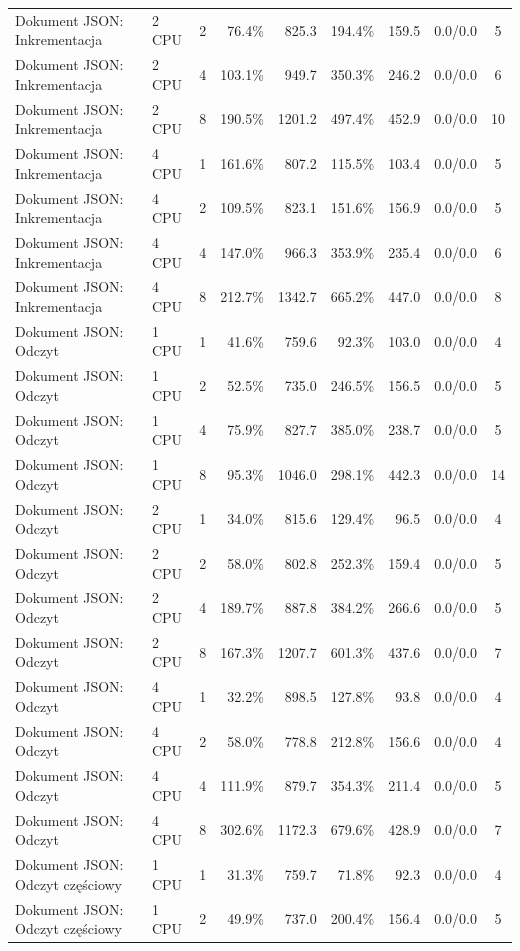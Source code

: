 \begin{table}[ht]
{\begin{tabular}{llcrrrrcc}
Dokument JSON: Inkrementacja & 2 CPU & 2 & 76.4\% & 825.3 & 194.4\% & 159.5 & 0.0/0.0 & 5 \\
Dokument JSON: Inkrementacja & 2 CPU & 4 & 103.1\% & 949.7 & 350.3\% & 246.2 & 0.0/0.0 & 6 \\
Dokument JSON: Inkrementacja & 2 CPU & 8 & 190.5\% & 1201.2 & 497.4\% & 452.9 & 0.0/0.0 & 10 \\
Dokument JSON: Inkrementacja & 4 CPU & 1 & 161.6\% & 807.2 & 115.5\% & 103.4 & 0.0/0.0 & 5 \\
Dokument JSON: Inkrementacja & 4 CPU & 2 & 109.5\% & 823.1 & 151.6\% & 156.9 & 0.0/0.0 & 5 \\
Dokument JSON: Inkrementacja & 4 CPU & 4 & 147.0\% & 966.3 & 353.9\% & 235.4 & 0.0/0.0 & 6 \\
Dokument JSON: Inkrementacja & 4 CPU & 8 & 212.7\% & 1342.7 & 665.2\% & 447.0 & 0.0/0.0 & 8 \\
Dokument JSON: Odczyt & 1 CPU & 1 & 41.6\% & 759.6 & 92.3\% & 103.0 & 0.0/0.0 & 4 \\
Dokument JSON: Odczyt & 1 CPU & 2 & 52.5\% & 735.0 & 246.5\% & 156.5 & 0.0/0.0 & 5 \\
Dokument JSON: Odczyt & 1 CPU & 4 & 75.9\% & 827.7 & 385.0\% & 238.7 & 0.0/0.0 & 5 \\
Dokument JSON: Odczyt & 1 CPU & 8 & 95.3\% & 1046.0 & 298.1\% & 442.3 & 0.0/0.0 & 14 \\
Dokument JSON: Odczyt & 2 CPU & 1 & 34.0\% & 815.6 & 129.4\% & 96.5 & 0.0/0.0 & 4 \\
Dokument JSON: Odczyt & 2 CPU & 2 & 58.0\% & 802.8 & 252.3\% & 159.4 & 0.0/0.0 & 5 \\
Dokument JSON: Odczyt & 2 CPU & 4 & 189.7\% & 887.8 & 384.2\% & 266.6 & 0.0/0.0 & 5 \\
Dokument JSON: Odczyt & 2 CPU & 8 & 167.3\% & 1207.7 & 601.3\% & 437.6 & 0.0/0.0 & 7 \\
Dokument JSON: Odczyt & 4 CPU & 1 & 32.2\% & 898.5 & 127.8\% & 93.8 & 0.0/0.0 & 4 \\
Dokument JSON: Odczyt & 4 CPU & 2 & 58.0\% & 778.8 & 212.8\% & 156.6 & 0.0/0.0 & 4 \\
Dokument JSON: Odczyt & 4 CPU & 4 & 111.9\% & 879.7 & 354.3\% & 211.4 & 0.0/0.0 & 5 \\
Dokument JSON: Odczyt & 4 CPU & 8 & 302.6\% & 1172.3 & 679.6\% & 428.9 & 0.0/0.0 & 7 \\
Dokument JSON: Odczyt częściowy & 1 CPU & 1 & 31.3\% & 759.7 & 71.8\% & 92.3 & 0.0/0.0 & 4 \\
Dokument JSON: Odczyt częściowy & 1 CPU & 2 & 49.9\% & 737.0 & 200.4\% & 156.4 & 0.0/0.0 & 5 \\

\end{tabular}}
\end{table}
